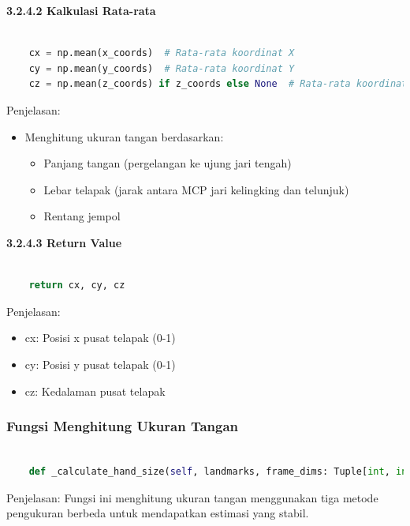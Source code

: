 \documentclass[11pt,a4paper]{article}
\begin{document}
    \noindent\textbf{3.2.4.2  Kalkulasi Rata-rata}
    \begin{lstlisting}[language=Python, caption= Kalkulasi Rata-rata]

    cx = np.mean(x_coords)  # Rata-rata koordinat X
    cy = np.mean(y_coords)  # Rata-rata koordinat Y
    cz = np.mean(z_coords) if z_coords else None  # Rata-rata koordinat Z jika ada
    \end{lstlisting}
    Penjelasan:
    \begin{itemize}
        \item Menghitung ukuran tangan berdasarkan:
        \begin{itemize}
            \item Panjang tangan (pergelangan ke ujung jari tengah)
            \item Lebar telapak (jarak antara MCP jari kelingking dan telunjuk)
            \item Rentang jempol
        \end{itemize}
    \end{itemize}

    \noindent\textbf{3.2.4.3 Return Value}
    \begin{lstlisting}[language=Python, caption=Return Value]

    return cx, cy, cz
    \end{lstlisting}
    Penjelasan:
    \begin{itemize}
        \item cx: Posisi x pusat telapak (0-1)
        \item cy: Posisi y pusat telapak (0-1)
        \item cz: Kedalaman pusat telapak 
    \end{itemize}

    \subsubsection{Fungsi Menghitung Ukuran Tangan}
    \begin{lstlisting}[language=Python, caption=Menghitung Ukuran Tangan]
    
    def _calculate_hand_size(self, landmarks, frame_dims: Tuple[int, int]) -> float:
    \end{lstlisting}
    Penjelasan:
    Fungsi ini menghitung ukuran tangan menggunakan tiga metode pengukuran berbeda untuk mendapatkan estimasi yang stabil.
\end{document}

